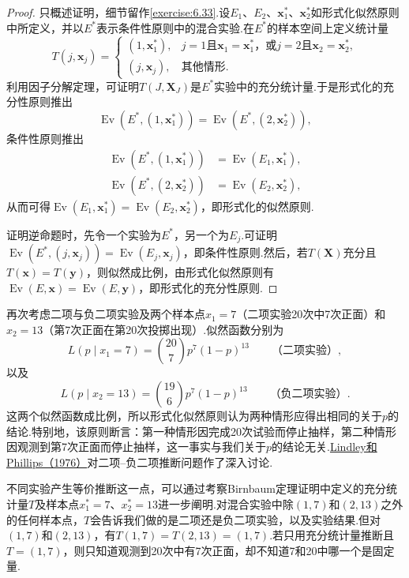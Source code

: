 \begin{proof}
只概述证明，细节留作\autoref{exercise:6.33}.设$E_1$、$E_2$、$\boldsymbol x_1^*$、$\boldsymbol x_2^*$如形式化似然原则中所定义，并以$E^*$表示条件性原则中的混合实验.在$E^*$的样本空间上定义统计量
$$T(j,\boldsymbol x_j)=\begin{cases}(1,\boldsymbol x_1^*),&j=1\text{且}\boldsymbol x_1=\boldsymbol x_1^*\text{，或}j=2\text{且}\boldsymbol x_2=\boldsymbol x_2^*,\\(j,\boldsymbol x_j),&\text{其他情形}.\end{cases}$$
利用因子分解定理，可证明$T(J,\boldsymbol X_J)$是$E^*$实验中的充分统计量.于是形式化的充分性原则推出
\begin{equation}\label{eq:6.3.4}
\operatorname{Ev}(E^*,(1,\boldsymbol x_1^*))=\operatorname{Ev}(E^*,(2,\boldsymbol x_2^*)),
\end{equation}
条件性原则推出
\begin{equation}\label{eq:6.3.5}
\begin{aligned}
\operatorname{Ev}(E^*,(1,\boldsymbol x_1^*))&=\operatorname{Ev}(E_1,\boldsymbol x_1^*),\\
\operatorname{Ev}(E^*,(2,\boldsymbol x_2^*))&=\operatorname{Ev}(E_2,\boldsymbol x_2^*),
\end{aligned}
\end{equation}
从而可得$\operatorname{Ev}(E_1,\boldsymbol x_1^*)=\operatorname{Ev}(E_2,\boldsymbol x_2^*)$，即形式化的似然原则.

证明逆命题时，先令一个实验为$E^*$，另一个为$E_j$.可证明$\operatorname{Ev}(E^*,(j,\boldsymbol x_j))=\operatorname{Ev}(E_j,\boldsymbol x_j)$，即条件性原则.然后，若$T(\boldsymbol X)$充分且$T(\boldsymbol x)=T(\boldsymbol y)$，则似然成比例，由形式化似然原则有$\operatorname{Ev}(E,\boldsymbol x)=\operatorname{Ev}(E,\boldsymbol y)$，即形式化的充分性原则.
\end{proof}
\begin{example}[续\autoref{ex:6.3.5}]\label{ex:6.3.7}
再次考虑二项与负二项实验及两个样本点$x_1=7$（二项实验20次中7次正面）和$x_2=13$（第7次正面在第20次投掷出现）.似然函数分别为
$$L(p\mid x_1=7)=\binom{20}7p^7(1-p)^{13}\qquad\text{（二项实验）},$$
以及
$$L(p\mid x_2=13)=\binom{19}6p^7(1-p)^{13}\qquad\text{（负二项实验）}.$$
这两个似然函数成比例，所以形式化似然原则认为两种情形应得出相同的关于$p$的结论.特别地，该原则断言：第一种情形因完成20次试验而停止抽样，第二种情形因观测到第7次正面而停止抽样，这一事实与我们关于$p$的结论无关.\hyperref[bib:source206]{Lindley和Phillips（1976）}对二项–负二项推断问题作了深入讨论.
\end{example}
不同实验产生等价推断这一点，可以通过考察Birnbaum定理证明中定义的充分统计量$T$及样本点$x_1^*=7$、$x_2^*=13$进一步阐明.对混合实验中除$(1,7)$和$(2,13)$之外的任何样本点，$T$会告诉我们做的是二项还是负二项实验，以及实验结果.但对$(1,7)$和$(2,13)$，有$T(1,7)=T(2,13)=(1,7)$.若只用充分统计量推断且$T=(1,7)$，则只知道观测到20次中有7次正面，却不知道7和20中哪一个是固定量.

